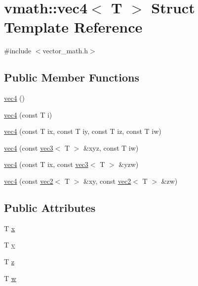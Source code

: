 \hypertarget{structvmath_1_1vec4}{\section{vmath\-:\-:vec4$<$ T $>$ Struct Template Reference}
\label{structvmath_1_1vec4}
}


{\ttfamily \#include $<$vector\-\_\-math.\-h$>$}

\subsection*{Public Member Functions}
\begin{DoxyCompactItemize}
\item 
\hyperlink{structvmath_1_1vec4_ab339e0a107be5ecd41e10a539dea647b}{vec4} ()
\item 
\hyperlink{structvmath_1_1vec4_a96b0a3cd945e3673d88b2848c1cd0a3c}{vec4} (const T i)
\item 
\hyperlink{structvmath_1_1vec4_ad95c9d244f2403d05cea985fae9be951}{vec4} (const T ix, const T iy, const T iz, const T iw)
\item 
\hyperlink{structvmath_1_1vec4_a9f867dc5bcab1fa4c186b51053ffc6e2}{vec4} (const \hyperlink{structvmath_1_1vec3}{vec3}$<$ T $>$ \&xyz, const T iw)
\item 
\hyperlink{structvmath_1_1vec4_a90fa357adc01af3abe6054028d734546}{vec4} (const T ix, const \hyperlink{structvmath_1_1vec3}{vec3}$<$ T $>$ \&yzw)
\item 
\hyperlink{structvmath_1_1vec4_a172fa929550c88cfddb31d63184f460b}{vec4} (const \hyperlink{structvmath_1_1vec2}{vec2}$<$ T $>$ \&xy, const \hyperlink{structvmath_1_1vec2}{vec2}$<$ T $>$ \&zw)
\end{DoxyCompactItemize}
\subsection*{Public Attributes}
\begin{DoxyCompactItemize}
\item 
T \hyperlink{structvmath_1_1vec4_ab9fab0426b3422f64ad9332d584e8bfd}{x}
\item 
T \hyperlink{structvmath_1_1vec4_a49b993a66463b01b7e6bc1b69326f51b}{y}
\item 
T \hyperlink{structvmath_1_1vec4_ad4cca05756c717809fcb75175ca48da3}{z}
\item 
T \hyperlink{structvmath_1_1vec4_a252fc54e651ae78b9c90c7196628c39e}{w}
\end{DoxyCompactItemize}


